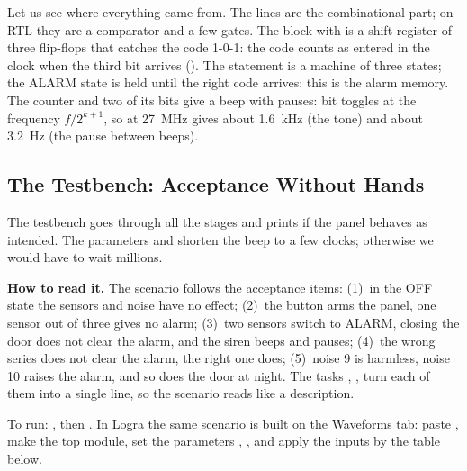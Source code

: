 Let us see where everything came from. The  lines are the
combinational part; on RTL they are a comparator and a few gates. The
 block with  is a shift register of three
flip-flops that catches the code 1-0-1: the code counts as entered in the clock
when the third bit arrives (). The  statement is a
machine of three states; the ALARM state is held until the right code arrives:
this is the alarm memory. The counter  and two of its bits give a beep
with pauses: bit  toggles at the frequency $f/2^{k+1}$, so at 27~MHz
 gives about 1.6~kHz (the tone) and  about 3.2~Hz
(the pause between beeps).

\subsection{The Testbench: Acceptance Without Hands}

The testbench goes through all the stages and prints  if
the panel behaves as intended. The parameters  and 
shorten the beep to a few clocks; otherwise we would have to wait millions.


\textbf{How to read it.} The scenario follows the acceptance items: (1)~in the OFF
state the sensors and noise have no effect; (2)~the button arms the panel, one
sensor out of three gives no alarm; (3)~two sensors switch to ALARM, closing the
door does not clear the alarm, and the siren beeps and pauses; (4)~the wrong
series  does not clear the alarm, the right one  does;
(5)~noise 9 is harmless, noise 10 raises the alarm, and so does the door at
night. The tasks , ,  turn each of them
into a single line, so the scenario reads like a description.

To run: , then
. In Logra the same scenario is built on the Waveforms tab: paste
, make  the top module, set the parameters
, , and apply the inputs by the table below.


